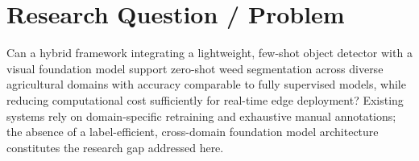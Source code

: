 \section{Research Question / Problem}
Can a hybrid framework integrating a lightweight, few-shot object detector with a visual foundation model support zero-shot weed segmentation across diverse agricultural domains with accuracy comparable to fully supervised models, while reducing computational cost sufficiently for real-time edge deployment? Existing systems rely on domain-specific retraining and exhaustive manual annotations; the absence of a label-efficient, cross-domain foundation model architecture constitutes the research gap addressed here.